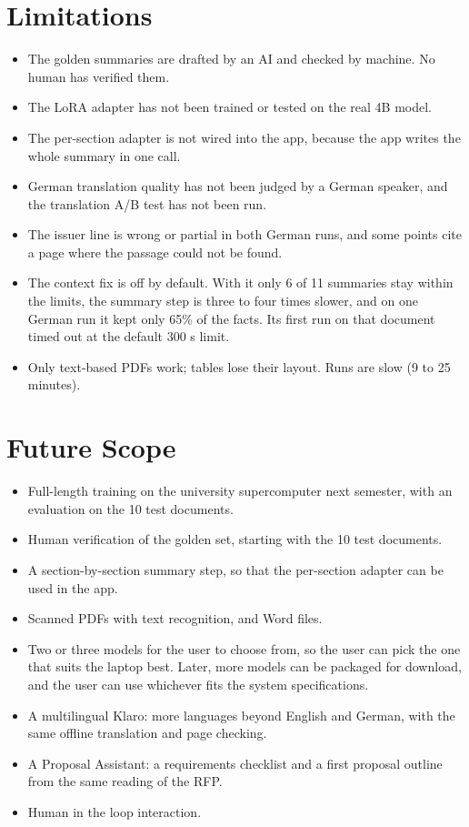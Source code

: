 \documentclass[11pt,a4paper,oneside]{report}
\begin{document}
\section{Limitations}
\begin{itemize}
\item The golden summaries are drafted by an AI and checked by machine. No human has verified them.
\item The LoRA adapter has not been trained or tested on the real 4B model.
\item The per-section adapter is not wired into the app, because the app writes the whole summary in one call.
\item German translation quality has not been judged by a German speaker, and the translation A/B test has not been run.
\item The issuer line is wrong or partial in both German runs, and some points cite a page where the passage could not be found.
\item The context fix is off by default. With it only 6 of 11 summaries stay within the limits, the summary step is three to four times slower, and on one German run it kept only 65\% of the facts. Its first run on that document timed out at the default 300 s limit.
\item Only text-based PDFs work; tables lose their layout. Runs are slow (9 to 25 minutes).
\end{itemize}

\section{Future Scope}
\begin{itemize}
\item Full-length training on the university supercomputer next semester, with an evaluation on the 10 test documents.
\item Human verification of the golden set, starting with the 10 test documents.
\item A section-by-section summary step, so that the per-section adapter can be used in the app.
\item Scanned PDFs with text recognition, and Word files.
\item Two or three models for the user to choose from, so the user can pick the one that suits the laptop best. Later, more models can be packaged for download, and the user can use whichever fits the system specifications.
\item A multilingual Klaro: more languages beyond English and German, with the same offline translation and page checking.
\item A Proposal Assistant: a requirements checklist and a first proposal outline from the same reading of the RFP.
\item Human in the loop interaction.
\end{itemize}
\end{document}
